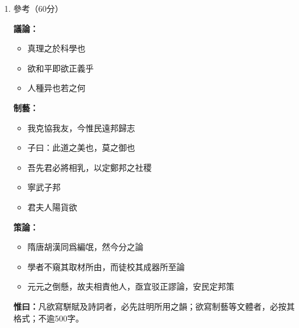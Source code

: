 \documentclass[12pt,a4paper]{article}
\begin{document}
\begin{enumerate}[leftmargin=*, label=\textbf{\arabic*.}, start=23]
    \item 參考（60分）
    
    \textbf{議論：}
    \begin{itemize}[leftmargin=2em, itemsep=0.5ex, parsep=0.5ex]
        \item 真理之於科學也
        \item 欲和平即欲正義乎
        \item 人種异也若之何
    \end{itemize}
    
    \textbf{制藝：}
    \begin{itemize}[leftmargin=2em, itemsep=0.5ex, parsep=0.5ex]
        \item 我克協我友，今惟民遠邦歸志
        \item 子曰：此道之美也，莫之御也
        \item 吾先君必將相乳，以定鄭邦之社稷
        \item 寧武子邦
        \item 君夫人陽貨欲
    \end{itemize}
    
    \textbf{策論：}
    \begin{itemize}[leftmargin=2em, itemsep=0.5ex, parsep=0.5ex]
        \item 隋唐胡漢同爲編氓，然今分之論
        \item 學者不窺其取材所由，而徒校其成器所至論
        \item 元元之倒懸，故夫相責他人，亟宜驳正謬論，安民定邦策
    \end{itemize}
    
    \vspace{1em}
    
    \textbf{惟曰：}凡欲寫駢賦及詩詞者，必先註明所用之韻；欲寫制藝等文體者，必按其格式；不逾500字。
    
    \vspace{25em}
\end{enumerate}
\end{document}

